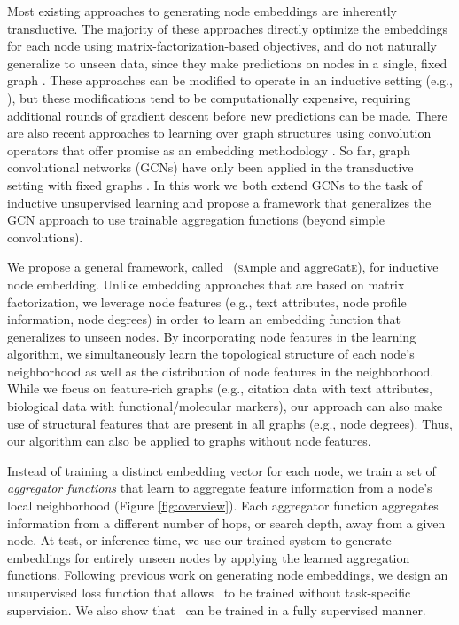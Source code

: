  Most existing approaches to generating node embeddings are inherently transductive.
 The majority of these approaches directly optimize the embeddings for each node using matrix-factorization-based objectives, and do not naturally generalize to unseen data, since they make predictions on nodes in a single, fixed graph \cite{cao2015grarep,grover2016node2vec,ng2001spectral,perozzi2014deepwalk,tang2015line,
 wang2016structural,wang2017community,xu2017embedding}.
 These approaches can be modified to operate in an inductive setting (e.g., \cite{perozzi2014deepwalk}), but these modifications tend to be computationally expensive, requiring additional rounds of gradient descent before new predictions can be made. 
 There are also recent approaches to learning over graph structures using convolution operators that offer promise as an embedding methodology \cite{kipf2016semi}.
 So far, graph convolutional networks (GCNs)  have only been applied in the transductive setting with fixed graphs \cite{kipf2016semi,kipf2016variational}. 
 In this work we both extend GCNs to the task of inductive unsupervised learning and propose a framework that generalizes the GCN approach to use trainable aggregation functions (beyond simple convolutions). 

 We propose a general framework, called \name\ (\textsc{sa}mple and aggre\textsc{g}at\textsc{e}), for inductive node embedding.
Unlike embedding approaches that are based on matrix factorization, we leverage node features (e.g., text attributes, node profile information, node degrees) in order to learn an embedding function that generalizes to unseen nodes. 
By incorporating node features in the learning algorithm, we simultaneously learn the topological structure of each node's neighborhood as well as the distribution of node features in the neighborhood.
While we focus on feature-rich graphs (e.g., citation data with text attributes, biological data with functional/molecular markers), our approach can also make use of structural features that are present in all graphs (e.g., node degrees).
Thus, our algorithm can also be applied to graphs without node features.

Instead of training a distinct embedding vector for each node, we train a set of {\em aggregator functions} that learn to aggregate feature information from a node's local neighborhood (Figure \ref{fig:overview}).
Each aggregator function aggregates information from a different number of hops, or search depth, away from a given node. 
At test, or inference time, we use our trained system to generate embeddings for entirely unseen nodes by applying the learned aggregation functions. 
Following previous work on generating node embeddings, we design an unsupervised loss function that allows \name\ to be trained without task-specific supervision.
We also show that \name\ can be trained in a fully supervised manner. 

